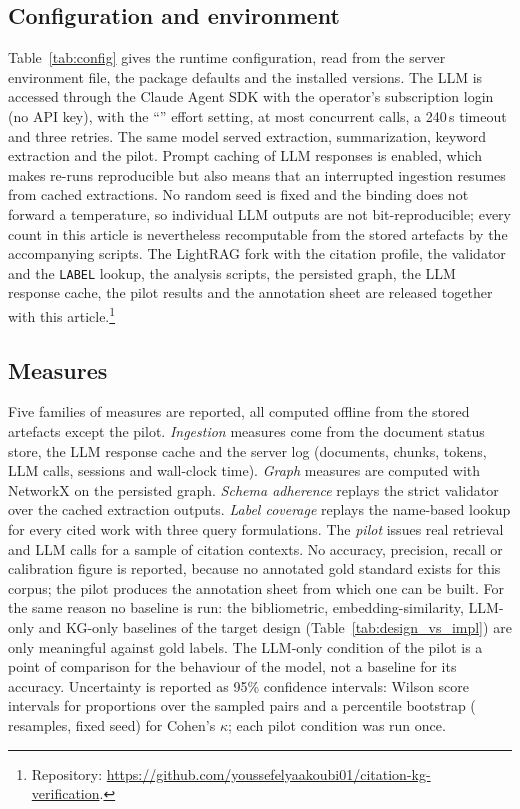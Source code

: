 \documentclass[lettersize,journal]{IEEEtran}
\begin{document}


\subsection{Configuration and environment}

Table~\ref{tab:config} gives the runtime configuration, read from the server environment file, the package defaults and the installed versions. The LLM is \texttt{\llmModel} accessed through the Claude Agent SDK with the operator's subscription login (no API key), with the ``\llmEffort'' effort setting, at most \maxAsync{} concurrent calls, a 240\,s timeout and three retries. The same model served extraction, summarization, keyword extraction and the pilot. Prompt caching of LLM responses is enabled, which makes re-runs reproducible but also means that an interrupted ingestion resumes from cached extractions. No random seed is fixed and the binding does not forward a temperature, so individual LLM outputs are not bit-reproducible; every count in this article is nevertheless recomputable from the stored artefacts by the accompanying scripts. The LightRAG fork with the citation profile, the validator and the \texttt{LABEL} lookup, the analysis scripts, the persisted graph, the LLM response cache, the pilot results and the annotation sheet are released together with this article.\footnote{Repository: \url{https://github.com/youssefelyaakoubi01/citation-kg-verification}.}



\subsection{Measures}

Five families of measures are reported, all computed offline from the stored artefacts except the pilot. \emph{Ingestion} measures come from the document status store, the LLM response cache and the server log (documents, chunks, tokens, LLM calls, sessions and wall-clock time). \emph{Graph} measures are computed with NetworkX on the persisted graph. \emph{Schema adherence} replays the strict validator over the cached extraction outputs. \emph{Label coverage} replays the name-based lookup for every cited work with three query formulations. The \emph{pilot} issues real retrieval and LLM calls for a sample of citation contexts. No accuracy, precision, recall or calibration figure is reported, because no annotated gold standard exists for this corpus; the pilot produces the annotation sheet from which one can be built. For the same reason no baseline is run: the bibliometric, embedding-similarity, LLM-only and KG-only baselines of the target design (Table~\ref{tab:design_vs_impl}) are only meaningful against gold labels. The LLM-only condition of the pilot is a point of comparison for the behaviour of the model, not a baseline for its accuracy. Uncertainty is reported as 95\% confidence intervals: Wilson score intervals for proportions over the sampled pairs and a percentile bootstrap (\pilotBootstrapResamples{} resamples, fixed seed) for Cohen's $\kappa$; each pilot condition was run once.
\end{document}
